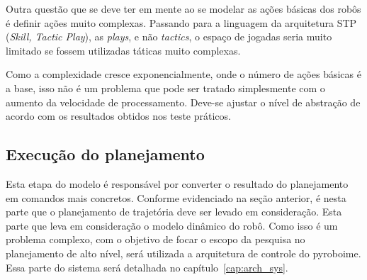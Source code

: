 Outra questão que se deve ter em mente ao se modelar as ações básicas dos robôs
é definir ações muito complexas. Passando para a linguagem da arquitetura STP
(\textit{Skill, Tactic Play}), as \textit{plays}, e não \textit{tactics}, o
espaço de jogadas seria muito limitado se fossem utilizadas táticas muito
complexas.

Como a complexidade cresce exponencialmente, onde o número de ações básicas é
a base, isso não é um problema que pode ser tratado simplesmente com o aumento
da velocidade de processamento. Deve-se ajustar o nível de abstração de acordo
com os resultados obtidos nos teste práticos.

\subsection{Execução do planejamento}

Esta etapa do modelo é responsável por converter o resultado do planejamento em
comandos mais concretos. Conforme evidenciado na seção anterior, é nesta parte
que o planejamento de trajetória deve ser levado em consideração. Esta parte que
leva em consideração o modelo dinâmico do robô.
Como isso é um problema complexo, com o objetivo de focar o escopo da pesquisa
no planejamento de alto nível, será utilizada a arquitetura de controle do
pyroboime. Essa parte do sistema será detalhada no capítulo~\ref{cap:arch_sys}.

